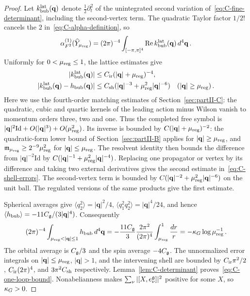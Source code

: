 \begin{proof}
Let $k^{\rm lat}_{\rm bub}(\mathbf q)$ denote $\tfrac12\partial_t^2$ of the unintegrated second variation of~\eqref{eq:C-fine-determinant}, including the second-vertex term. The quadratic Taylor factor $1/2!$ cancels the $2$ in~\eqref{eq:C-alpha-definition}, so
\begin{equation}\label{eq:C-lattice-coefficient}
 \alpha^{(1)}_{F^2}(\widehat Y_{\mu_{\rm reg}})=(2\pi)^{-4}\int_{[-\pi,\pi]^4}\operatorname{Re}k^{\rm lat}_{\rm bub}(\mathbf q)\,d^4\mathbf q\,.
\end{equation}
Uniformly for $0<\mu_{\rm reg}\le1$, the lattice estimates give
\begin{align}\label{eq:C-shell-errors}
 |k^{\rm lat}_{\rm bub}(\mathbf q)|&\le C_{\rm ir}(|\mathbf q|+\mu_{\rm reg})^{-4},\nonumber\\
 |k^{\rm lat}_{\rm bub}(\mathbf q)-h_{\rm bub}(\mathbf q)|&\le C_{\rm sh}(|\mathbf q|^{-3}+\mu_{\rm reg}^2|\mathbf q|^{-6})\quad (|\mathbf q|\ge\mu_{\rm reg})\,.
\end{align}
Here we use the fourth-order matching estimates of Section~\ref{sec:partII-C}: the quadratic, cubic and quartic kernels of the leading action minus Wilson vanish to momentum orders three, two and one. Thus the completed free symbol is $|\mathbf q|^2\mathrm{Id}+O(|\mathbf q|^3)+O(\mu_{\rm reg}^2)$. Its inverse is bounded by $C(|\mathbf q|+\mu_{\rm reg})^{-2}$: the quadratic-form lower bound of Section~\ref{sec:partII-B} applies for $|\mathbf q|\ge\mu_{\rm reg}$, and $\mathfrak m_{\mu_{\rm reg}}\ge2^{-9}\mu_{\rm reg}^2$ for $|\mathbf q|\le\mu_{\rm reg}$. The resolvent identity then bounds the difference from $|\mathbf q|^{-2}\mathrm{Id}$ by $C(|\mathbf q|^{-1}+\mu_{\rm reg}^2|\mathbf q|^{-4})$. Replacing one propagator or vertex by its difference and taking two external derivatives gives the second estimate in~\eqref{eq:C-shell-errors}. The second-vertex term is bounded by $C(|\mathbf q|^{-2}+\mu_{\rm reg}^2|\mathbf q|^{-6})$ on the unit ball. The regulated versions of the same products give the first estimate.

Spherical averages give $\langle q_2^2\rangle=|\mathbf q|^2/4$, $\langle q_1^2q_2^2\rangle=|\mathbf q|^4/24$, and hence $\langle h_{\rm bub}\rangle=-11C_{\mathfrak{g}}/(3|\mathbf q|^4)$. Consequently
\begin{equation}\label{eq:C-shell-integral}
 (2\pi)^{-4}\int_{\mu_{\rm reg}<|\mathbf q|\le1}h_{\rm bub}\,d^4\mathbf q
 =-\frac{11\casimir}{3}\frac{2\pi^2}{(2\pi)^4}\int_{\mu_{\rm reg}}^1\frac{dr}{r}
 =-\slope\log\mu_{\rm reg}^{-1}\,.
\end{equation}
The orbital average is $C_{\mathfrak{g}}/3$ and the spin average $-4C_{\mathfrak{g}}$. The unnormalized error integrals on $|\mathbf q|\le\mu_{\rm reg}$, $|\mathbf q|>1$, and the intervening shell are bounded by $C_{\rm ir}\pi^2/2$, $C_{\rm ir}(2\pi)^4$, and $3\pi^2C_{\rm sh}$ respectively. Lemma~\ref{lem:C-determinant} proves~\eqref{eq:C-one-loop-bound}. Nonabelianness makes $\sum_\nu|[X,e_\nu^{\mathfrak{g}}]|^2$ positive for some $X$, so $\kappa_G>0$.
\end{proof}

